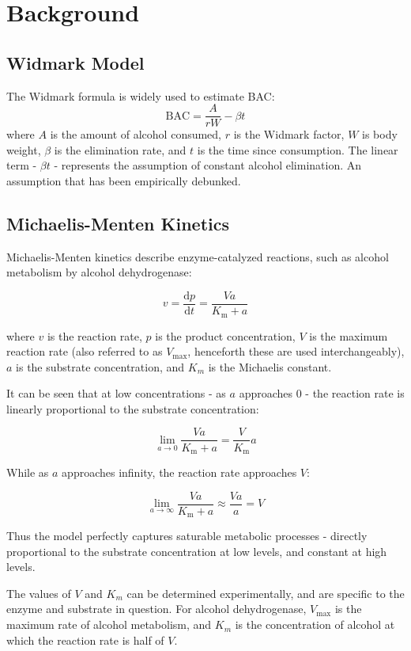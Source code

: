 \documentclass[12pt]{article}
\begin{document}
\section{Background}

\subsection{Widmark Model}
The Widmark formula is widely used to estimate BAC:
\[
\text{BAC} = \frac{A}{rW} - \beta t
\]
where $A$ is the amount of alcohol consumed, $r$ is the Widmark factor, $W$ is body weight, $\beta$ is the elimination rate, and $t$ is the time since consumption. The linear term - $\beta t$ - represents the assumption of constant alcohol elimination. An assumption that has been empirically debunked.

\subsection{Michaelis-Menten Kinetics}
Michaelis-Menten kinetics describe enzyme-catalyzed reactions, such as alcohol metabolism by alcohol dehydrogenase:

\[
    {\displaystyle v={\frac {\mathrm {d} p}{\mathrm {d} t}}={\frac {Va}{K_{\mathrm {m} }+a}}}
\]

where $v$ is the reaction rate, $p$ is the product concentration, $V$ is the maximum reaction rate (also referred to as $V_{\text{max}}$, henceforth these are used interchangeably), $a$ is the substrate concentration, and $K_m$ is the Michaelis constant. 

It can be seen that at low concentrations - as $a$ approaches 0 - the reaction rate is linearly proportional to the substrate concentration:

\[
    {\displaystyle \lim _{a\to 0}{\frac {Va}{K_{\mathrm {m} }+a}}={\frac {V}{K_{\mathrm {m} }}a}}
\]

While as $a$ approaches infinity, the reaction rate approaches $V$:

\[
    {\displaystyle \lim _{a\to \infty }{\frac {Va}{K_{\mathrm {m} }+a}} \approx  \frac{Va}{a} = V}
\]

Thus the model perfectly captures saturable metabolic processes - directly proportional to the substrate concentration at low levels, and constant at high levels.

The values of $V$ and $K_m$ can be determined experimentally, and are specific to the enzyme and substrate in question. For alcohol dehydrogenase, $V_{\text{max}}$ is the maximum rate of alcohol metabolism, and $K_m$ is the concentration of alcohol at which the reaction rate is half of $V$.
\end{document}
